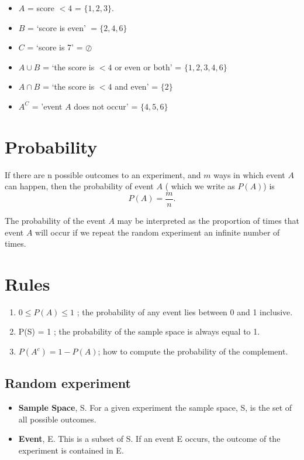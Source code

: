 \documentclass[]{report}
\begin{document}
{{{\begin{itemize}
\item  $A$ = score $< 4$ = $\{1,2,3\}$.
\item  $B$ = `score is even' $= \{2,4,6\}$
\item  $C$ = `score is 7' = $\boldsymbol{\oslash}$\\
\item  $A \cup B$ = `the score is $< 4$ or even or both' = $\{1,2,3,4,6\}$\\
\item  $A \cap B$ = `the score is $< 4$ and even' = $\{2\}$\\
\item  $A^C$  = 'event $A$ does not occur' = $\{4,5,6\}$
\end{itemize}


\section{Probability}
If there are n possible outcomes to an experiment, and $m$ ways in which event $A$ can happen, then the probability of event $A$ ( which we write as $P(A)$) is
\[P(A) = \frac{m}{n}.\]

The probability of the event $A$ may be interpreted as the proportion of times that event $A$ will occur if we repeat the random experiment an infinite number of times.\\ \bigskip


\section{Rules}
\begin{enumerate}
\item  $0 \leq P(A) \leq 1$ ; the probability of any event lies between 0 and 1 inclusive.
\item  P(S) = 1 ; the probability of the sample space is always equal to 1.
\item  $P(A^c) = 1- P(A)$; how to compute the probability of the complement.
\end{enumerate}


\subsection{Random experiment}
\begin{itemize}
\item \textbf{Sample Space}, S. For a given experiment the sample space, S, is the set of all
possible outcomes.
\item \textbf{Event}, E. This is a subset of S. If an event E occurs, the outcome of the experiment is contained in E.
\end{itemize}


}}}
\end{document}
